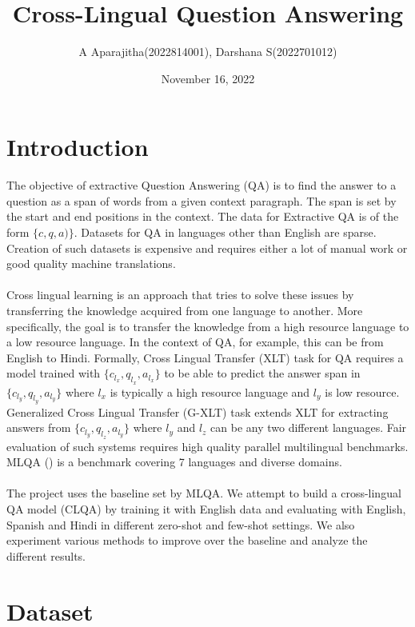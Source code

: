 \documentclass[12pt]{article}   %
\begin{document}
\title{Cross-Lingual Question Answering}   %
\author{A Aparajitha(2022814001), Darshana S(2022701012)}         %
\date{November 16, 2022}    %
\maketitle

\section{Introduction}

The objective of extractive Question Answering (QA) is to find the answer to a question as a span of words from a given context paragraph. The span is set by the start and end positions in the context. The data for Extractive QA is of the form $\{c, q, a)\}$. Datasets for QA in languages other than English are sparse. Creation of such datasets is expensive and requires either a lot of manual work or good quality machine translations. \\ \\Cross lingual learning is an approach that tries to solve these issues by transferring the knowledge acquired from one language to another. More specifically, the goal is to transfer the knowledge from a high resource language to a low resource language. In the context of QA, for example, this can be from English to Hindi. Formally, Cross Lingual Transfer (XLT) task for QA requires a model trained with $\{c_{l_{x}}, q_{l_{x}}, a_{l_{x}}\}$ to be able to predict the answer span in $\{c_{l_{y}}, q_{l_{y}}, a_{l_{y}}\}$ where $l_{x}$ is typically a high resource language and $l_{y}$ is low resource. Generalized Cross Lingual Transfer (G-XLT) task extends XLT for extracting answers from $\{c_{l_{y}}, q_{l_{z}}, a_{l_{y}}\}$ where $l_{y}$ and $l_{z}$ can be any two different languages. Fair evaluation of such systems requires high quality parallel multilingual benchmarks. MLQA (\cite{lewis2020mlqa}) is a benchmark covering 7 languages and diverse domains. 
\\ \\The project uses the baseline set by MLQA. We attempt to build a cross-lingual QA model (CLQA) by training it with English data and evaluating with English, Spanish and Hindi in different zero-shot and few-shot settings. We also experiment various methods to improve over the baseline and analyze the different results.

\section{Dataset}
\end{document}

